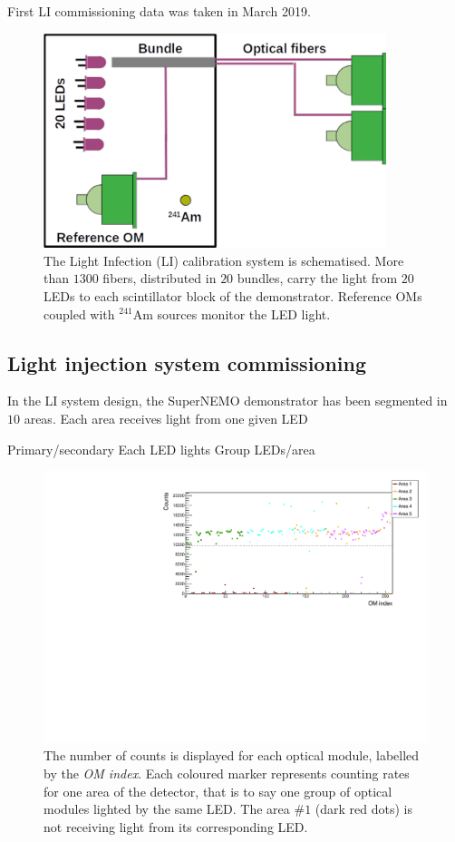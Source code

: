 First LI commissioning data was taken in March 2019.



\begin{figure}[h]
  \centering
  \includegraphics[width=10cm]{commissioning/fig_commissioning/LIS_scheme.pdf}

  \caption{The Light Infection (LI) calibration system is schematised.
    More than $1300$ fibers, distributed in $20$ bundles, carry the light from $20$ LEDs to each scintillator block of the demonstrator.
    Reference OMs coupled with $^{241}$Am sources monitor the LED light.
    \label{fig:LIS_scheme}}
\end{figure}

\subsection{Light injection system commissioning}


In the LI system design, the SuperNEMO demonstrator has been segmented in $10$ areas.
Each area receives light from one given LED

Primary/secondary
Each LED lights
Group LEDs/area

\begin{figure}[h]
  \centering
  \includegraphics[width=15cm]{commissioning/fig_commissioning/LI_1d_counts.pdf}
  \caption{The number of counts is displayed for each optical module, labelled by the \emph{OM index}.
    Each coloured marker represents counting rates for one area of the detector, that is to say one group of optical modules lighted by the same LED.
    The area \#$1$ (dark red dots) is not receiving light from its corresponding LED.
    \label{fig:LI_counts}}
\end{figure}


